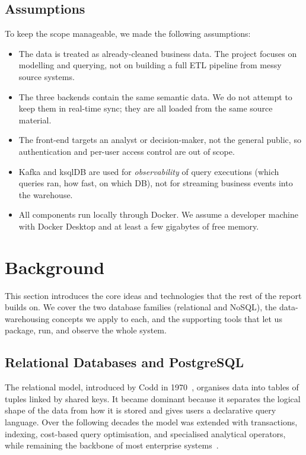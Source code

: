 \documentclass[11pt,a4paper]{article}
\begin{document}
\subsection{Assumptions}

To keep the scope manageable, we made the following assumptions:

\begin{itemize}[leftmargin=*]
    \item The data is treated as already-cleaned business data. The project
          focuses on modelling and querying, not on building a full ETL
          pipeline from messy source systems.
    \item The three backends contain the same semantic data. We do not
          attempt to keep them in real-time sync; they are all loaded from
          the same source material.
    \item The front-end targets an analyst or decision-maker, not the
          general public, so authentication and per-user access control
          are out of scope.
    \item Kafka and ksqlDB are used for \emph{observability} of query
          executions (which queries ran, how fast, on which DB), not for
          streaming business events into the warehouse.
    \item All components run locally through Docker. We assume a developer
          machine with Docker Desktop and at least a few gigabytes of free
          memory.
\end{itemize}

\section{Background}\label{sec:background}

This section introduces the core ideas and technologies that the rest of
the report builds on. We cover the two database families (relational and
NoSQL), the data-warehousing concepts we apply to each, and the supporting
tools that let us package, run, and observe the whole system.

\subsection{Relational Databases and PostgreSQL}

The relational model, introduced by Codd in 1970~\cite{codd1970relational},
organises data into tables of tuples linked by shared keys. It became
dominant because it separates the logical shape of the data from how it is
stored and gives users a declarative query language. Over the following
decades the model was extended with transactions, indexing, cost-based
query optimisation, and specialised analytical operators, while remaining
the backbone of most enterprise systems~\cite{stonebraker2010sqlvsnosql}.
\end{document}
